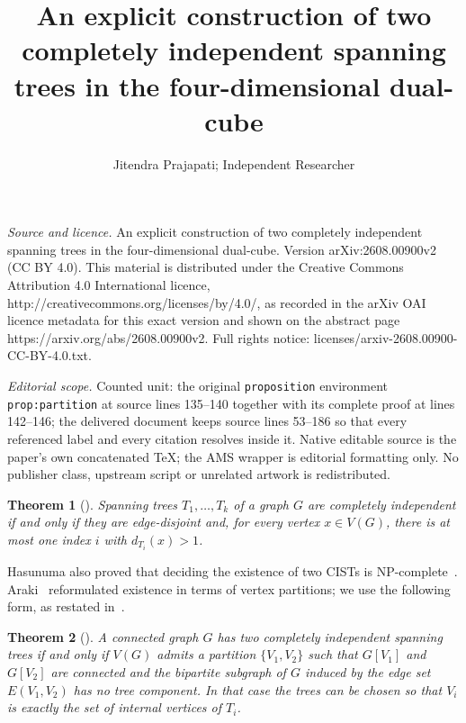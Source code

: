 \documentclass[10pt,a4paper]{amsart}
\newtheorem{theorem}{Theorem}
\begin{document}
\title[An explicit construction of two completely independent spann]{An explicit construction of two completely independent spanning trees in the four-dimensional dual-cube}
\author{Jitendra Prajapati; Independent Researcher}
\date{}
\maketitle
\noindent\emph{Source and licence.} An explicit construction of two completely independent spanning trees in the four-dimensional dual-cube. Version arXiv:2608.00900v2 (CC BY 4.0). This material is distributed under the Creative Commons Attribution 4.0 International licence, http://creativecommons.org/licenses/by/4.0/, as recorded in the arXiv OAI licence metadata for this exact version and shown on the abstract page https://arxiv.org/abs/2608.00900v2. Full rights notice: licenses/arxiv-2608.00900-CC-BY-4.0.txt.\par\smallskip
\noindent\textit{Editorial scope.} Counted unit: the original \texttt{proposition} environment \texttt{prop:partition} at source lines 135--140 together with its complete proof at lines 142--146; the delivered document keeps source lines 53--186 so that every referenced label and every citation resolves inside it. Native editable source is the paper's own concatenated TeX; the AMS wrapper is editorial formatting only. No publisher class, upstream script or unrelated artwork is redistributed.
\begin{theorem}[\cite{Hasunuma2001}]\label{thm:hasunuma}
Spanning trees $T_1,\dots,T_k$ of a graph $G$ are completely independent if
and only if they are edge-disjoint and, for every vertex $x\in V(G)$, there
is at most one index $i$ with $d_{T_i}(x)>1$.
\end{theorem}

Hasunuma also proved that deciding the existence of two CISTs is
NP-complete~\cite{Hasunuma2002}. Araki~\cite{Araki2014} reformulated
existence in terms of vertex partitions; we use the following form, as
restated in~\cite{QinHaoWu2022}.

\begin{theorem}[\cite{Araki2014}]\label{thm:araki}
A connected graph $G$ has two completely independent spanning trees if and
only if $V(G)$ admits a partition $\{V_1,V_2\}$ such that $G[V_1]$ and
$G[V_2]$ are connected and the bipartite subgraph of $G$ induced by the
edge set $E(V_1,V_2)$ has no tree component. In that case the trees can be
chosen so that $V_i$ is exactly the set of internal vertices of $T_i$.
\end{theorem}
\end{document}
